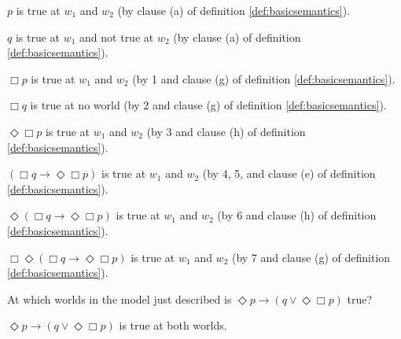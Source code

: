 \begin{enumerate*}
  \item $p$ is true at $w_{1}$ and $w_{2}$ (by clause (a) of definition
  \ref{def:basicsemantics}).
  \item $q$ is true at $w_{1}$ and not true at $w_{2}$ (by clause (a) of definition
  \ref{def:basicsemantics}).
  \item $\Box p$ is true at $w_{1}$ and $w_{2}$ (by 1 and clause (g) of definition
  \ref{def:basicsemantics}).
  \item $\Box q$ is true at no world (by 2 and clause (g) of definition
  \ref{def:basicsemantics}).
  \item $\Diamond\Box p$ is true at $w_{1}$ and $w_{2}$ (by 3 and clause (h) of
  definition \ref{def:basicsemantics}).
  \item $(\Box q \to \Diamond\Box p)$ is true at $w_{1}$ and $w_{2}$ (by 4, 5,
  and clause (e) of definition \ref{def:basicsemantics}).
  \item $\Diamond(\Box q \to \Diamond\Box p)$ is true at $w_{1}$ and $w_{2}$ (by
  6 and clause (h) of definition \ref{def:basicsemantics}).
  \item $\Box\Diamond(\Box q \to \Diamond\Box p)$ is true at $w_{1}$ and $w_{2}$ (by 7
  and clause (g) of definition \ref{def:basicsemantics}).
\end{enumerate*}

\begin{exercise}
  At which worlds in the model just described is
  $\Diamond p \to (q \lor \Diamond\Box p)$ true?
\end{exercise}
\begin{solution}
  $\Diamond p \to (q \lor \Diamond\Box p)$ is true at both worlds.
\end{solution}



